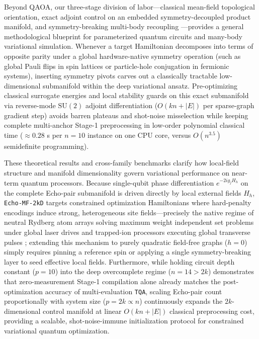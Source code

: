 \documentclass[10pt,a4paper]{article}
\begin{document}
Beyond QAOA, our three-stage division of labor---classical mean-field topological orientation, exact adjoint control on an embedded symmetry-decoupled product manifold, and symmetry-breaking multi-body recoupling \citep{dupont2022entanglement}---provides a general methodological blueprint for parameterized quantum circuits and many-body variational simulation. Whenever a target Hamiltonian decomposes into terms of opposite parity under a global hardware-native symmetry operation (such as global Pauli flips in spin lattices or particle-hole conjugation in fermionic systems), inserting symmetry pivots carves out a classically tractable low-dimensional submanifold within the deep variational ansatz. Pre-optimizing classical surrogate energies and local stability guards on this exact submanifold via reverse-mode $\mathrm{SU}(2)$ adjoint differentiation ($O(kn + |E|)$ per sparse-graph gradient step) avoids barren plateaus and shot-noise misselection while keeping complete multi-anchor Stage-1 preprocessing in low-order polynomial classical time ($\approx 0.28$ s per $n=10$ instance on one CPU core, versus $O(n^{3.5})$ semidefinite programming).

These theoretical results and cross-family benchmarks clarify how local-field structure and manifold dimensionality govern variational performance on near-term quantum processors. Because single-qubit phase differentiation $e^{-2i g_j H_h}$ on the complete Echo-pair submanifold is driven directly by local external fields $H_h$, \texttt{Echo-MF-2kD} targets constrained optimization Hamiltonians where hard-penalty encodings induce strong, heterogeneous site fields---precisely the native regime of neutral Rydberg atom arrays solving maximum weight independent set problems under global laser drives \citep{pichler2018quantum,ebadi2022quantum} and trapped-ion processors executing global transverse pulses \citep{pagano2020quantum}; extending this mechanism to purely quadratic field-free graphs ($h = 0$) simply requires pinning a reference spin or applying a single symmetry-breaking layer to seed effective local fields. Furthermore, while holding circuit depth constant ($p = 10$) into the deep overcomplete regime ($n = 14 > 2k$) demonstrates that zero-measurement Stage-1 compilation alone already matches the post-optimization accuracy of multi-evaluation \texttt{TQA}, scaling Echo-pair count proportionally with system size ($p = 2k \propto n$) continuously expands the $2k$-dimensional control manifold at linear $O(kn + |E|)$ classical preprocessing cost, providing a scalable, shot-noise-immune initialization protocol for constrained variational quantum optimization.
\end{document}
